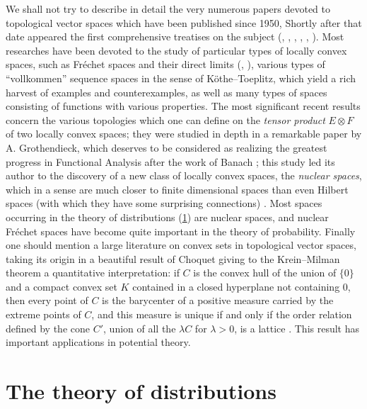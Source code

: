 \documentclass[12pt,a4paper,leqno,twoside]{extbook}
\begin{document}
We shall not try to describe in detail the very numerous papers devoted to topological vector spaces which have been published since 1950, Shortly after that date appeared the first comprehensive treatises on the subject (\cite{026}, \cite{062}, \cite{092}, \cite{125}, \cite{128}, \cite{215}). Most researches have been devoted to the study of particular types of locally convex spaces, such as Fréchet spaces and their direct limits (\cite{055}, \cite{092}), various types of ``vollkommen'' sequence spaces in the sense of Köthe--Toeplitz, which yield a rich harvest of examples and counterexamples, as well as many types of spaces consisting of functions with various properties. The most significant recent results concern the various topologies which one can define on the \emph{tensor product} \(E \otimes F\) of two locally convex spaces; they were studied in depth in a remarkable paper by A. Grothendieck, which deserves to be considered as realizing the greatest progress in Functional Analysis after the work of Banach \cite{091}; this study led its author to the discovery of a new class of locally convex spaces, the \emph{nuclear spaces}, which in a sense are much closer to finite dimensional spaces than even Hilbert spaces (with which they have some surprising connections) \cite{059}. Most spaces occurring in the theory of distributions (\ref{sec:8.3}) are nuclear spaces, and nuclear Fréchet spaces have become quite important in the theory of probability. Finally one should mention a large literature on convex sets in topological vector spaces, taking its origin in a beautiful result of Choquet giving to the Krein--Milman theorem a quantitative interpretation: if \(C\) is the convex hull of the union of \(\{0\}\) and a compact convex set \(K\) contained in a closed hyperplane not containing \(0\), then every point of \(C\) is the barycenter of a positive measure carried by the extreme points of \(C\), and this measure is unique if and only if the order relation defined by the cone \(C'\), union of all the \(\lambda C\) for \(\lambda > 0\), is a lattice \cite{042}. This result has important applications in potential theory.

\section{The theory of distributions}
\label{sec:8.3}
\end{document}
